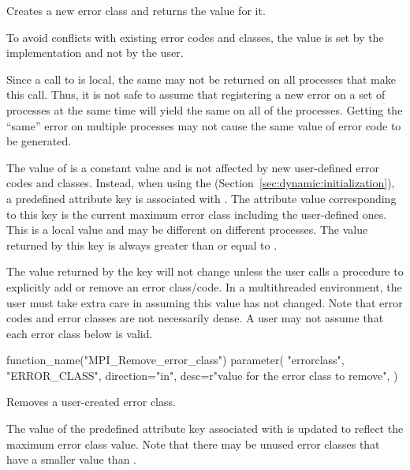 Creates a new error class and returns the value for it.

\begin{rationale}
To avoid conflicts with existing error codes and classes, the value is
set by the implementation and not by the user.
\end{rationale}

\begin{users}
Since a call to  is local, the same
 may not be returned on all processes that make
this call.  Thus, it is not safe to assume that registering a new
error on a set of processes at the same time will yield the same
 on all of the processes. Getting the ``same''
error on multiple processes may not cause the same value of error
code to be generated.
\end{users}

The value of 
is a constant value and 
is not affected by new user-defined
error codes and classes.  
Instead, when using the \wpm{} (Section~\ref{sec:dynamic:initialization}), a predefined attribute key  is
associated with
.  The attribute value corresponding to this key
is the current maximum error class including the user-defined ones.
This is a local value and may be different on different processes.  
The value returned by this key is always greater than or equal to
.

\begin{users}
The value returned by the key
 will not change unless the user calls a
procedure to explicitly add or remove an error class/code.  In a multithreaded
environment, the user must take extra care in assuming this value has
not changed.
Note that error codes and error classes are not necessarily dense.  A user may not assume that each error class below  is valid.
\end{users}


\begin{mpi-binding}
    function_name("MPI_Remove_error_class")
    parameter(
        "errorclass",
        "ERROR_CLASS",
        direction="in",
        desc=r"value for the error class to remove",
    )
\end{mpi-binding}

Removes a user-created error class.

The value of the predefined attribute key  associated with
 is updated to reflect the maximum error class value. Note that there may be
unused error classes that have a smaller value than .

